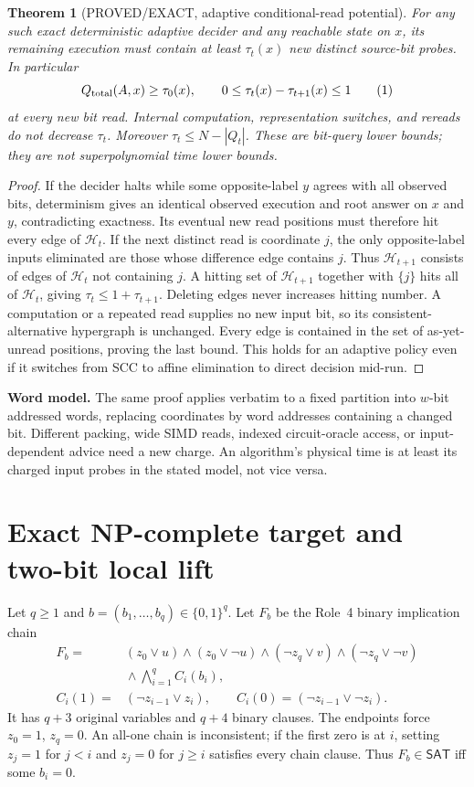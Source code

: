 \documentclass[11pt]{article}
\newtheorem{theorem}{Theorem}
\newcommand{\SAT}{\mathsf{SAT}}
\begin{document}
\begin{theorem}[PROVED/EXACT, adaptive conditional-read potential]\label{th:potential}
For any such exact deterministic adaptive decider and any reachable
state on $x$, its remaining execution must contain at least
$\tau_t(x)$ \emph{new distinct source-bit probes}. In particular
\[
Q_{\rm total}(A,x)\ge\tau_0(x),\qquad
0\le\tau_t(x)-\tau_{t+1}(x)\le1
\tag{1}
\]
at every new bit read. Internal computation, representation switches,
and rereads do not decrease $\tau_t$.
Moreover $\tau_t\le N-|Q_t|$. These are bit-query lower bounds;
they are not superpolynomial time lower bounds.
\end{theorem}
\begin{proof}
If the decider halts while some opposite-label $y$ agrees with all
observed bits, determinism gives an identical observed execution and
root answer on $x$ and $y$, contradicting exactness. Its eventual new
read positions must therefore hit every edge of $\mathcal H_t$.
If the next distinct read is coordinate $j$, the only opposite-label
inputs eliminated are those whose difference edge contains $j$.
Thus $\mathcal H_{t+1}$ consists of edges of $\mathcal H_t$ not
containing $j$. A hitting set of $\mathcal H_{t+1}$ together with
$\{j\}$ hits all of $\mathcal H_t$, giving
$\tau_t\le1+\tau_{t+1}$. Deleting edges never increases hitting
number. A computation or a repeated read supplies no new input bit,
so its consistent-alternative hypergraph is unchanged. Every edge
is contained in the set of as-yet-unread positions, proving the
last bound. This holds for an adaptive policy even if it switches from
SCC to affine elimination to direct decision mid-run.
\end{proof}
\noindent\textbf{Word model.} The same proof applies verbatim to a
fixed partition into $w$-bit addressed words, replacing coordinates
by word addresses containing a changed bit. Different packing, wide
SIMD reads, indexed circuit-oracle access, or input-dependent advice
need a new charge. An algorithm's physical time is at least its
charged input probes in the stated model, not vice versa.

\section{Exact NP-complete target and two-bit local lift}
Let $q\ge1$ and $b=(b_1,\ldots,b_q)\in\{0,1\}^q$.
Let $F_b$ be the Role~4 binary implication chain
\[
\begin{split}
F_b={}&(z_0\lor u)\land(z_0\lor\neg u)
\land(\neg z_q\lor v)\land(\neg z_q\lor\neg v)\\
&{}\land\bigwedge_{i=1}^q C_i(b_i),\\
C_i(1)={}&(\neg z_{i-1}\lor z_i),\qquad
C_i(0)=(\neg z_{i-1}\lor\neg z_i).
\end{split}\tag{2}
\]
It has $q+3$ original variables and $q+4$ binary clauses.
The endpoints force $z_0=1$, $z_q=0$. An all-one chain is
inconsistent; if the first zero is at $i$, setting $z_j=1$
for $j<i$ and $z_j=0$ for $j\ge i$ satisfies every chain
clause. Thus $F_b\in\SAT$ iff some $b_i=0$.
\end{document}
